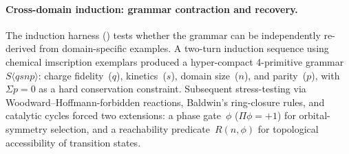 \documentclass[12pt,a4paper]{article}
\makeatletter
\renewcommand{\_}{\ig@origunderscore\discretionary{}{}{}}
\makeatother
\begin{document}
\paragraph{Cross-domain induction: grammar contraction and recovery.}
\label{par:kimi_induction}
The induction harness () tests whether the grammar
can be independently re-derived from domain-specific examples. A two-turn
induction sequence using chemical imscription exemplars produced a hyper-compact
4-primitive grammar $S\langle q s n p \rangle$: charge fidelity~($q$),
kinetics~($s$), domain size~($n$), and parity~($p$), with $\Sigma p = 0$ as
a hard conservation constraint. Subsequent stress-testing via
Woodward--Hoffmann-forbidden reactions, Baldwin's ring-closure rules, and
catalytic cycles forced two extensions: a phase gate~$\phi$ ($\Pi\phi = +1$)
for orbital-symmetry selection, and a reachability predicate~$R(n,\phi)$ for
topological accessibility of transition states.
\end{document}
